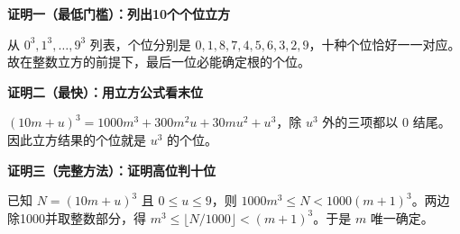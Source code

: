 \clearpage
\begin{proofbox}
\textbf{\textcolor{CProof}{证明一（最低门槛）：列出10个个位立方}}
\par\medskip
\begin{center}

\end{center}
\medskip
从 $0^3,1^3,\ldots,9^3$ 列表，个位分别是 $0,1,8,7,4,5,6,3,2,9$，十种个位恰好一一对应。故在整数立方的前提下，最后一位必能确定根的个位。
\end{proofbox}
\clearpage
\begin{proofbox}
\textbf{\textcolor{CProof}{证明二（最快）：用立方公式看末位}}
\par\medskip
\begin{center}

\end{center}
\medskip
$(10m+u)^3=1000m^3+300m^2u+30mu^2+u^3$，除 $u^3$ 外的三项都以 $0$ 结尾。因此立方结果的个位就是 $u^3$ 的个位。
\end{proofbox}
\clearpage
\begin{proofbox}
\textbf{\textcolor{CProof}{证明三（完整方法）：证明高位判十位}}
\par\medskip
\begin{center}

\end{center}
\medskip
已知 $N=(10m+u)^3$ 且 $0\le u\le9$，则 $1000m^3\le N<1000(m+1)^3$。两边除1000并取整数部分，得 $m^3\le \lfloor N/1000\rfloor<(m+1)^3$。于是 $m$ 唯一确定。
\end{proofbox}
